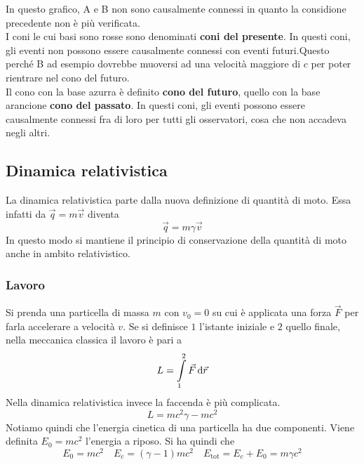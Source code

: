 In questo grafico, A e B non sono causalmente connessi in quanto la considione precedente non è
più verificata.\\
I coni le cui basi sono rosse sono denominati \textbf{coni del presente}. In questi coni, gli 
eventi non possono essere causalmente connessi con eventi futuri.Questo perché B ad esempio 
dovrebbe muoversi ad una velocità maggiore di $c$ per poter rientrare nel cono del futuro.\\
Il cono con la base azurra è definito \textbf{cono del futuro}, quello con la base arancione
\textbf{cono del passato}. In questi coni, gli eventi possono essere causalmente connessi fra di 
loro per tutti gli osservatori, cosa che non accadeva negli altri.

\subsection{Dinamica relativistica}
La dinamica relativistica parte dalla nuova definizione di quantità di moto. Essa infatti da
$\vec{q}=m\vec{v}$ diventa
\begin{equation*}
  \vec{q} = m\gamma\vec{v}
\end{equation*}
In questo modo si mantiene il principio di conservazione della quantità di moto anche in ambito
relativistico.
\subsubsection{Lavoro}
Si prenda una particella di massa $m$ con $v_0=0$ su cui è applicata una forza $\vec{F}$ per farla
accelerare a velocità $v$. Se si definisce $1$ l'istante iniziale e $2$ quello finale, nella
meccanica classica il lavoro è pari a
\begin{equation*}
  L = \int\limits_{1}^{2} \vec{F}\mathop{}\!\mathrm{d}\vec{r}
\end{equation*}
Nella dinamica relativistica invece la faccenda è più complicata.
\begin{equation*}
  L = mc^2\gamma-mc^2
\end{equation*}
Notiamo quindi che l'energia cinetica di una particella ha due componenti. Viene definita
$E_0=mc^2$ l'energia a riposo. Si ha quindi che
\begin{equation*}
  E_0=mc^2\quad E_c=(\gamma-1)mc^2\quad E_{\text{tot}}=E_c+E_0=m\gamma c^2
\end{equation*}
